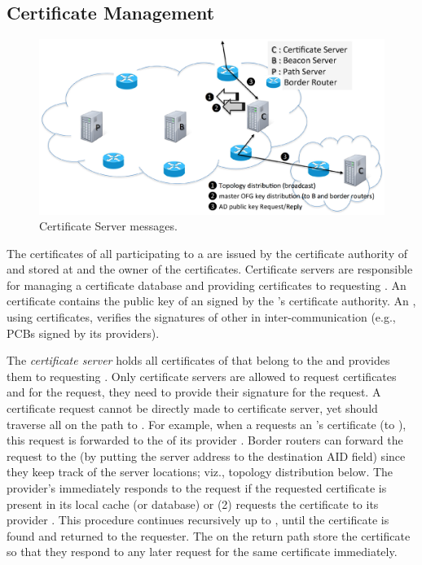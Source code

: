 
\subsection{Certificate Management} 

\begin{figure}[ht]
\centering
\includegraphics[width=.9\columnwidth]{./fig/cs_message.eps}
\caption{Certificate Server messages.}\label{fig:cs-message}
\end{figure}

 The certificates of all participating \ADs to a \TD are issued by the certificate authority of \TD and stored at \TDC \ADs and the owner of the certificates. Certificate servers are responsible for managing a certificate database and providing certificates to requesting \ADs. An \AD certificate contains the public key of an \AD signed by the \TD's certificate authority. An \AD, using \AD certificates, verifies the signatures of other \ADs in inter-\AD communication (e.g., PCBs signed by its providers).

The {\em \TDC certificate server} holds all certificates of \ADs that belong to the \TD and provides them to requesting \ADs. Only certificate servers are allowed to request \AD certificates and for the request, they need to provide their signature for the request. A certificate request cannot be directly made to \TDC certificate server, yet should traverse all \CSs on the path to \TDC. For example, when a \STUB \AD requests an \AD's certificate (to \TDC), this request is forwarded to the \CS of its provider \AD. Border routers can forward the request to the \CS (by putting the server address to the destination AID field) since they keep track of the server locations; viz., topology distribution below. The provider's \CS immediately responds to the request if the requested certificate is present in its local cache (or database) or (2) requests the certificate to its provider \AD. This procedure continues recursively up to \TDC, until the certificate is found and returned to the requester. The \CSs on the return path store the certificate so that they respond to any later request for  the same certificate immediately. 

